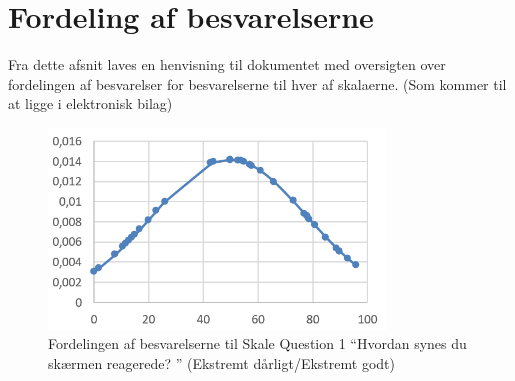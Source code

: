 \section{Fordeling af besvarelserne}
\label{TestAfSkalaFordelingAfBesvarelserne}
%
Fra dette afsnit laves en henvisning til dokumentet med oversigten over fordelingen af besvarelser for besvarelserne til hver af skalaerne. (Som kommer til at ligge i elektronisk bilag)
%
\begin{figure}[H]
\centering
\includegraphics[width = 0.8\textwidth]{Figure/DatabehandlingSkalaer/FordelingSkala1} 
\caption{Fordelingen af besvarelserne til Skale Question 1 ``Hvordan synes du skærmen reagerede? '' (Ekstremt dårligt/Ekstremt godt)}
\label{fig:FordelingSkala1}
\end{figure}
\noindent
%
